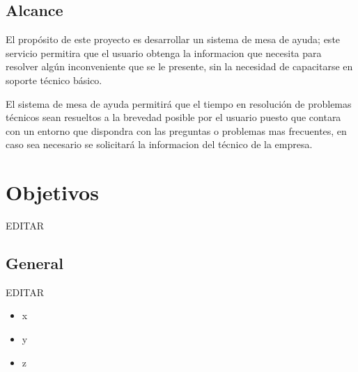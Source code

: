 \documentclass[preprint,12pt]{elsarticle}
\begin{document}

\subsection {\textbf{Alcance}}
El propósito de este proyecto es desarrollar un sistema de mesa de ayuda; este servicio permitira que el usuario obtenga la informacion que necesita para resolver algún inconveniente que se le presente, sin la necesidad de capacitarse en soporte técnico básico.

El sistema de mesa de ayuda permitirá que el tiempo en resolución de problemas técnicos sean resueltos a la brevedad posible por el usuario puesto que contara con un entorno que dispondra con las preguntas o problemas mas frecuentes, en caso sea necesario se solicitará la informacion del técnico de la empresa.



\section{Objetivos}

EDITAR\\

\begin{figure}[htb]
	\begin{center}
	\end{center}
\end{figure}


\subsection{\textbf{General}}

EDITAR\\

\begin{itemize}

\item x
\item y
\item z

\end{itemize}
\end{document}
